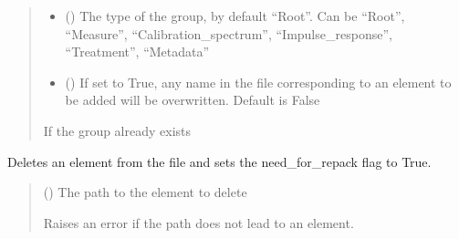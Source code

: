 \documentclass[letterpaper,10pt,english]{sphinxmanual}
\begin{document}
\begin{fulllineitems}
\begin{fulllineitems}
\begin{quote}
\begin{description}
\begin{itemize}
\item {} 
\sphinxAtStartPar
{} (\sphinxstyleliteralemphasis{\sphinxupquote{, }}) \textendash{} The type of the group, by default “Root”. Can be “Root”, “Measure”, “Calibration\_spectrum”, “Impulse\_response”, “Treatment”, “Metadata”

\item {} 
\sphinxAtStartPar
{} (\sphinxstyleliteralemphasis{\sphinxupquote{, }}) \textendash{} If set to True, any name in the file corresponding to an element to be added will be overwritten. Default is False

\end{itemize}

\sphinxAtStartPar
{\hyperref[\detokenize{_autosummary/HDF5_BLS.WrapperError:HDF5_BLS.WrapperError}]{}} \textendash{} If the group already exists

\end{description}\end{quote}

\end{fulllineitems}


\begin{fulllineitems}
\label{\detokenize{_autosummary/HDF5_BLS.wrapper:HDF5_BLS.wrapper.Wrapper.delete_element}}
\pysigstartsignatures
\pysiglinewithargsret
{}
{}
{}
\pysigstopsignatures
\sphinxAtStartPar
Deletes an element from the file and sets the need\_for\_repack flag to True.
\begin{quote}\begin{description}
\sphinxAtStartPar
{} () \textendash{} The path to the element to delete

\sphinxAtStartPar
{\hyperref[\detokenize{_autosummary/HDF5_BLS.WrapperError:HDF5_BLS.WrapperError}]{}} \textendash{} Raises an error if the path does not lead to an element.


\end{description}
\end{quote}
\end{fulllineitems}
\end{fulllineitems}
\end{document}
